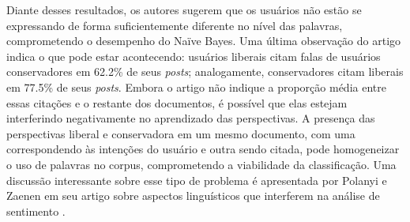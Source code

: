 Diante desses resultados, os autores sugerem que os usuários não estão se expressando de forma suficientemente diferente no nível das palavras, comprometendo o desempenho do Naïve Bayes. Uma última observação do artigo indica o que pode estar acontecendo: usuários liberais citam falas de usuários conservadores em 62.2\% de seus \emph{posts}; analogamente, conservadores citam liberais em 77.5\%  de seus \emph{posts}. Embora o artigo não indique a proporção média entre essas citações e o restante dos documentos, é possível que elas estejam interferindo negativamente no aprendizado das perspectivas. A presença das perspectivas liberal e conservadora em um mesmo documento, com uma correspondendo às intenções do usuário e outra sendo citada, pode homogeneizar o uso de palavras no corpus, comprometendo a viabilidade da classificação. Uma discussão interessante sobre esse tipo de problema é apresentada por Polanyi e Zaenen em seu artigo sobre aspectos linguísticos que interferem na análise de sentimento \cite{valence-shifters}.   



















